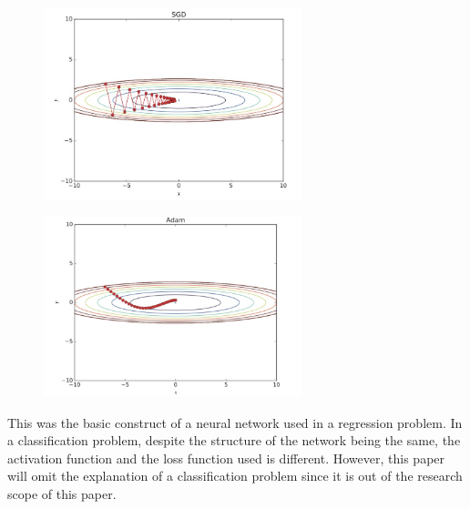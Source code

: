 \begin{figure}[!ht]
    \centering
    \begin{minipage}{.5\textwidth}
        \centering
        \includegraphics[width=7.5cm]{images/SGD.png}
        \label{fig:SGD}
    \end{minipage}%
    \begin{minipage}{.5\textwidth}
        \centering
        \includegraphics[width=7.5cm]{images/Adam.png}
        \label{fig:Adam}
    \end{minipage}%
\end{figure}

This was the basic construct of a neural network used in a regression problem. In a classification problem, despite the structure of the network being the same, the activation function and the loss function used is different. However, this paper will omit the explanation of a classification problem since it is out of the research scope of this paper. 

